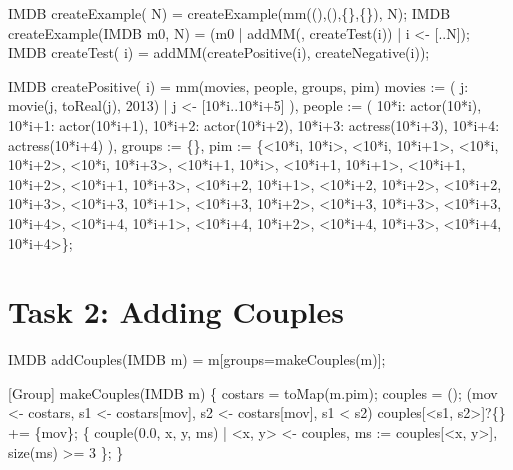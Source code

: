 \documentclass[submission,copyright,creativecommons]{eptcs}
\begin{document}
\begin{rascal}
IMDB createExample( N) = createExample(mm((),(),\{{}\}{},\{{}\}{}), N);
IMDB createExample(IMDB m0,  N) = (m0 | addMM(, createTest(i)) | i \textless{}- {}[..N]);
IMDB createTest( i) = addMM(createPositive(i), createNegative(i));
    
IMDB createPositive( i) = mm(movies, people, groups, pim)
     movies := ( j: movie(j, toReal(j), 2013) | j \textless{}- {}[10*i..10*i+5] ),
         people := ( 10*i: actor(10*i), 10*i+1: actor(10*i+1), 
                     10*i+2: actor(10*i+2), 10*i+3: actress(10*i+3), 
                     10*i+4: actress(10*i+4) ),
         groups := \{{}\}{},
         pim := \{{}\textless{}10*i, 10*i\textgreater{}, \textless{}10*i, 10*i+1\textgreater{}, \textless{}10*i, 10*i+2\textgreater{}, \textless{}10*i, 10*i+3\textgreater{},
                 \textless{}10*i+1, 10*i\textgreater{}, \textless{}10*i+1, 10*i+1\textgreater{}, \textless{}10*i+1, 10*i+2\textgreater{}, \textless{}10*i+1, 10*i+3\textgreater{},
                 \textless{}10*i+2, 10*i+1\textgreater{}, \textless{}10*i+2, 10*i+2\textgreater{}, \textless{}10*i+2, 10*i+3\textgreater{},
                 \textless{}10*i+3, 10*i+1\textgreater{}, \textless{}10*i+3, 10*i+2\textgreater{}, \textless{}10*i+3, 10*i+3\textgreater{}, \textless{}10*i+3, 10*i+4\textgreater{},
                 \textless{}10*i+4, 10*i+1\textgreater{}, \textless{}10*i+4, 10*i+2\textgreater{}, \textless{}10*i+4, 10*i+3\textgreater{}, \textless{}10*i+4, 10*i+4\textgreater{}\}{};          
\end{rascal}


\section{Task 2: Adding Couples}

\begin{rascal}
IMDB addCouples(IMDB m) = m{}[groups=makeCouples(m)];

[Group] makeCouples(IMDB m) \{{}
    costars = toMap(m.pim); couples = ();
     (mov \textless{}- costars, s1 \textless{}- costars{}[mov], s2 \textless{}- costars{}[mov], s1 \textless{} s2) 
       couples{}[\textless{}s1, s2\textgreater{}]?\{\} += \{{}mov\}{};
     \{{} couple(0.0, x, y, ms) 
                     | \textless{}x, y\textgreater{} \textless{}- couples, ms := couples{}[\textless{}x, y\textgreater{}], size(ms) \textgreater{}= 3 \}{};
\}{}
\end{rascal}
\end{document}
